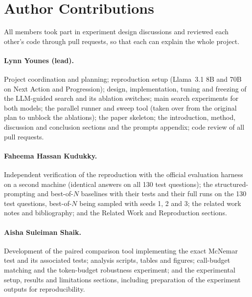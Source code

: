\section{Author Contributions}
\label{app:contributions}

All members took part in experiment design discussions and reviewed each other's code through pull
requests, so that each can explain the whole project.

\paragraph{Lynn Younes (lead).}
Project coordination and planning; reproduction setup (Llama~3.1 8B and 70B on Next Action and
Progression); design, implementation, tuning and freezing of the LLM-guided search and its ablation
switches; main search experiments for both models; the parallel runner and sweep tool (taken over
from the original plan to unblock the ablations); the paper skeleton; the introduction, method,
discussion and conclusion sections and the prompts appendix; code review of all pull requests.

\paragraph{Faheema Hassan Kudukky.}
Independent verification of the reproduction with the official evaluation harness on a second
machine (identical answers on all 130 test questions); the structured-prompting and best-of-$N$
baselines with their tests and their full runs on the 130 test questions, best-of-$N$ being sampled with
seeds 1, 2 and 3; the related work notes and bibliography; and the Related Work and Reproduction sections.

\paragraph{Aisha Suleiman Shaik.}
Development of the paired comparison tool implementing the exact McNemar test and its associated tests; analysis scripts, tables and figures; call-budget matching and the token-budget robustness experiment; and the experimental setup, results and limitations sections, including preparation of the experiment outputs for reproducibility.

